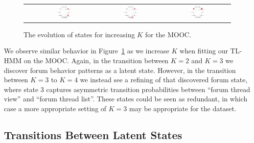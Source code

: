 \begin{figure}
\begin{tabular}{cccc}
    &
    \includegraphics[width=0.22\textwidth]{figures/sustain-4state/state1.png}
    &
    \includegraphics[width=0.22\textwidth]{figures/sustain-4state/state2.png}
    &
    \includegraphics[width=0.22\textwidth]{figures/sustain-4state/state3.png}
  \end{tabular}
  \caption{The evolution of states for increasing $K$ for the
  \protect\sustain{} MOOC.} %
  \label{fig:sustain-state-evolution}
\end{figure}

We observe similar behavior in Figure~\ref{fig:sustain-state-evolution}
as we increase $K$ when fitting our TL-HMM on the \sustain{} MOOC. Again,
in the transition between $K=2$ and $K=3$ we discover forum behavior
patterns as a latent state. However, in the transition between $K=3$ to
$K=4$ we instead see a refining of that discovered forum state, where
state 3 captures asymmetric transition probabilities between ``forum thread
view'' and ``forum thread list''. These states could be seen as redundant,
in which case a more appropriate setting of $K=3$ may be appropriate for
the \sustain{} dataset.

\subsection{Transitions Between Latent States}
